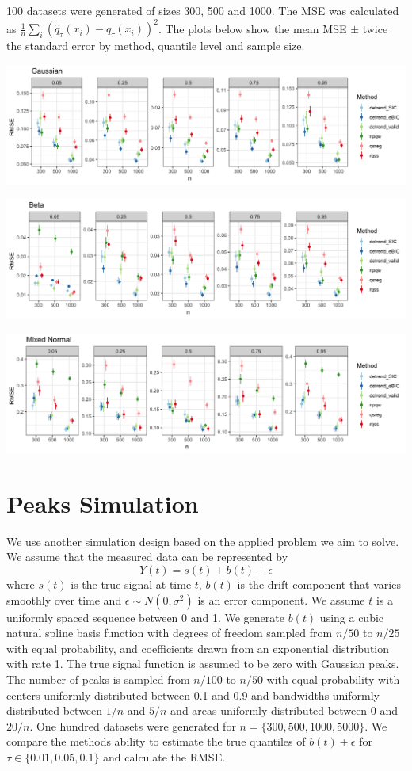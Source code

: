 \documentclass[]{article}
\begin{document}
100 datasets were generated of sizes 300, 500 and 1000. The MSE was calculated as $\frac{1}{n}\sum_i (\hat{q}_{\tau}(x_i) - q_\tau(x_i))^2$. The plots below show the mean MSE $\pm$ twice the standard error by method, quantile level and sample size. 
	 
\includegraphics[width=\linewidth]{Figures/gaus_mse.png}	

\includegraphics[width=\linewidth]{Figures/shapebeta_mse.png}

\includegraphics[width=\linewidth]{Figures/mixednorm_mse.png}


\section{Peaks Simulation}
We use another simulation design based on the applied problem we aim to solve. We assume that the measured data can be represented by 
\begin{equation}
Y(t) = s(t) + b(t) + \epsilon
\end{equation} 
where $s(t)$ is the true signal at time $t$, $b(t)$ is the drift component that varies smoothly over time and $\epsilon \sim N(0, \sigma^2)$ is an error component. We assume $t$ is a uniformly spaced sequence between 0 and 1. We generate $b(t)$ using a cubic natural spline basis function with degrees of freedom sampled from $n/50$ to $n/25$ with equal probability, and coefficients drawn from an exponential distribution with rate 1. The true signal function is assumed to be zero with Gaussian peaks. The number of peaks is sampled from $n/100$ to $n/50$ with equal probability with centers uniformly distributed between 0.1 and 0.9 and bandwidths uniformly distributed between $1/n$ and $5/n$ and areas uniformly distributed between 0 and $20/n$. One hundred datasets were generated for $n=\{300,500,1000, 5000\}$. We compare the methods ability to estimate the true quantiles of $b(t) + \epsilon$  for $\tau \in \{0.01, 0.05, 0.1\}$ and calculate the RMSE. 
\end{document}
